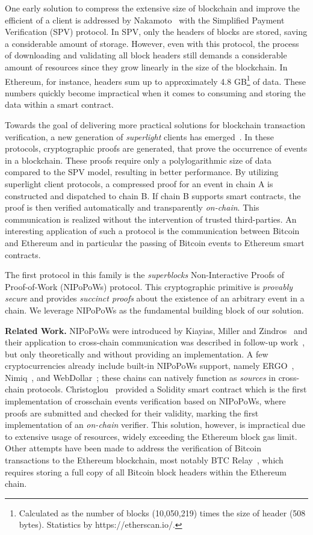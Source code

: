 One early solution to compress the extensive size of blockchain and improve the
efficient of a client is addressed by
Nakamoto~\cite{nakamoto} with the Simplified Payment Verification (SPV)
protocol. In SPV, only the headers of blocks are stored, saving a considerable
amount of storage.  However, even with this protocol, the process of
downloading and validating all block headers still demands a considerable
amount of resources since they grow linearly in the size of the blockchain.
In Ethereum, for instance, headers sum up to approximately 4.8
GB\footnote{Calculated as the number of blocks (10,050,219) times the size of
header (508 bytes). Statistics by https://etherscan.io/.} of data.
These numbers quickly become impractical when it comes to consuming and storing the
data within a smart contract.

Towards the goal of delivering more practical solutions for blockchain
transaction verification, a new generation of \emph{superlight}
clients has emerged~\cite{popow,nipopows,compactsuperblocks,flyclient}. In these
protocols, cryptographic proofs are generated, that prove the occurrence of
events in a blockchain. These proofs require only a polylogarithmic size of
data compared to the SPV model, resulting in better performance. By utilizing
superlight client protocols, a compressed proof for an event in chain A is
constructed and dispatched to chain B. If chain B supports smart contracts, the
proof is then verified automatically and transparently \emph{on-chain}. This
communication is realized without the intervention of trusted third-parties.
An interesting application of such a protocol is the communication between
Bitcoin and Ethereum and in particular the passing of Bitcoin events to Ethereum
smart contracts.

The first protocol in this family is the \emph{superblocks} Non-Interactive
Proofs of Proof-of-Work (NIPoPoWs) protocol. This cryptographic primitive is \emph{provably secure} and
provides \emph{succinct proofs} about the existence of an arbitrary event
in a chain. We leverage NIPoPoWs as the fundamental building block of
our solution.

\noindent
\textbf{Related Work.} NIPoPoWs
were introduced by Kiayias, Miller and Zindros~\cite{nipopows} and their
application to cross-chain communication was described in follow-up
work~\cite{pow-sidechains}, but only theoretically and without providing
an implementation. A few cryptocurrencies already
include built-in NIPoPoWs support, namely ERGO~\cite{ergo}, Nimiq~\cite{nimiq}, and
WebDollar~\cite{webdollar}; these chains can natively function as \emph{sources}
in cross-chain protocols.
Christoglou~\cite{gglou} provided a Solidity smart contract which is the first
implementation of crosschain events verification based on NIPoPoWs, where
proofs are submitted and checked for their validity, marking the first
implementation of an \emph{on-chain} verifier. This solution, however, is
impractical due to extensive usage of resources, widely exceeding the Ethereum
block gas limit.
Other attempts have been made to address the verification of Bitcoin
transactions to the Ethereum blockchain, most notably BTC
Relay~\cite{btcrelay}, which requires storing a full copy of all Bitcoin
block headers within the Ethereum chain.

